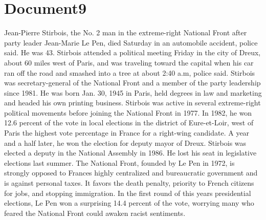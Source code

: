 \documentclass{article}
\begin{document}
\color[rgb]{0,0,0}\section{Document9}
\color[rgb]{0.7098039215686275,0.00392156862745098,0.15294117647058825}Jean-Pierre Stirbois, the No. 2 man in the extreme-right National Front after party leader Jean-Marie Le Pen, died Saturday in an automobile \color[rgb]{0.7333333333333333,0.09803921568627451,0.40784313725490196}accident, \color[rgb]{0.7098039215686275,0.00392156862745098,0.15294117647058825}police said. He was 43. Stirbois attended a political meeting Friday in the city of Dreux, about 60 miles west of Paris, and was traveling toward the capital when his car ran off the road and smashed into a tree at about 2:40 a.m, police said. Stirbois was secretary-general of the National Front and a member of the party leadership since 1981. He was born Jan. 30, 1945 in Paris, held \color[rgb]{0.7333333333333333,0.09803921568627451,0.40784313725490196}degrees in \color[rgb]{0.7098039215686275,0.00392156862745098,0.15294117647058825}law and \color[rgb]{0.3333333333333333,0.6588235294117647,0.9686274509803922}marketing and \color[rgb]{0.7098039215686275,0.00392156862745098,0.15294117647058825}headed his own printing business. Stirbois was active in several extreme-right political movements before joining the National Front in 1977. In 1982, he won 12.6 percent of the vote in local elections in the district of Eure-et-Loir, west of Paris  the highest vote \color[rgb]{0.3333333333333333,0.6588235294117647,0.9686274509803922}percentage in \color[rgb]{0.7098039215686275,0.00392156862745098,0.15294117647058825}France for a right-wing candidate. A year and a half later, he won the election for deputy mayor of Dreux. Stirbois was elected a deputy in the National Assembly in 1986. He lost his seat in legislative elections last summer. The National Front, founded by Le Pen in 1972, is strongly opposed to Frances \color[rgb]{0.3333333333333333,0.6588235294117647,0.9686274509803922}highly \color[rgb]{0.7098039215686275,0.00392156862745098,0.15294117647058825}centralized and bureaucratic government and is against personal \color[rgb]{0.3333333333333333,0.6588235294117647,0.9686274509803922}taxes. It \color[rgb]{0.7098039215686275,0.00392156862745098,0.15294117647058825}favors the death penalty, priority to French citizens for jobs, and stopping immigration. In the first round of this years presidential elections, Le Pen won a surprising 14.4 percent of the vote, worrying many who feared the National Front could awaken racist sentiments. 
\end{document}
